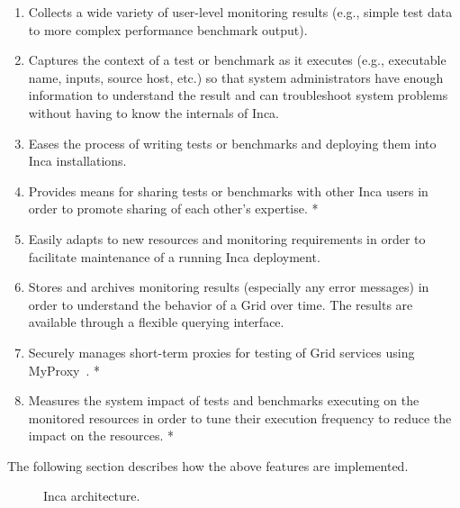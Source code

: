 \documentclass[times,10pt,twocolumn]{article}
\begin{document}
\begin{enumerate}

\item Collects a wide variety of user-level monitoring results (e.g., simple
test data to more complex performance benchmark output).  

\item Captures the context of a test or benchmark as it executes (e.g.,
executable name, inputs, source host, etc.) so that system administrators have
enough information to understand the result and can troubleshoot system
problems without having to know the internals of Inca. 

\item Eases the process of writing tests or benchmarks and deploying them into
Inca installations. 

\item Provides means for sharing tests or benchmarks with other Inca 
users in order to promote sharing of each other's expertise. * 

\item Easily adapts to new resources and monitoring requirements in order to
facilitate maintenance of a running Inca deployment. 

\item Stores and archives monitoring results (especially any error messages) 
in order to understand the behavior of a Grid over time. The results
are available through a flexible querying interface.

\item Securely manages short-term proxies for testing of Grid services using
MyProxy~\cite{myproxy}. *

\item Measures the system impact of tests and benchmarks executing on
the monitored resources in order to tune their execution frequency to
reduce the impact on the resources. *

\end{enumerate}

\noindent The following section describes how the above features are
implemented.


\begin{figure}[tbp]
  \centering
  \mbox{}
  \caption{\label{arch_fig} Inca architecture.}
\end{figure}
\end{document}
